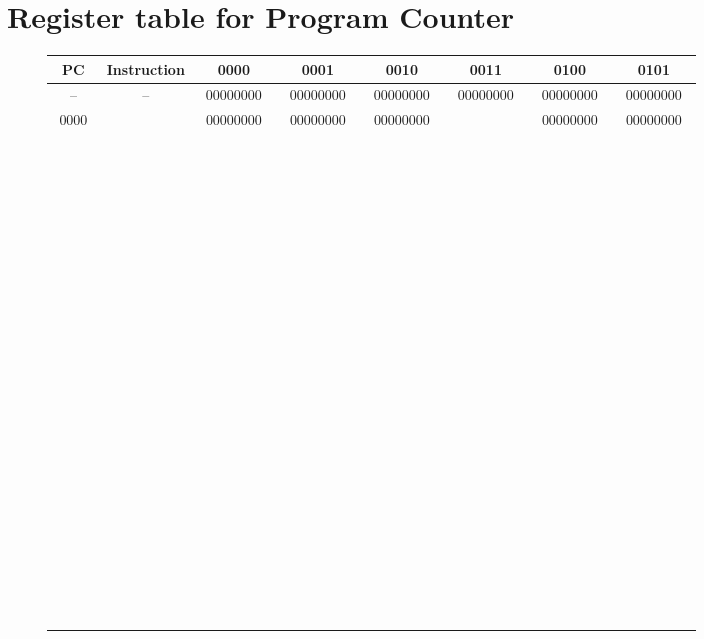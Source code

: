 \documentclass[11pt]{article}
\newcommand{\regname}{\textbf}
\begin{document}
\newpage

\section*{Register table for Program Counter}

\begin{figure}[h]
  \centering
  \begin{tabular}{|c|c||c|c|c|c|c|c|}
    \hline
    \regname{~PC~} &
    \regname{Instruction} &
    \regname{0000} & \regname{0001} & \regname{0010} &
    \regname{0011} & \regname{0100} & \regname{0101} \\
    \hline
    -- & -- & ~00000000~ & ~00000000~ & ~00000000~ & ~00000000~ & ~00000000~ & ~00000000~
    \\ \hline
    0000 & ~ & 00000000 & 00000000 & 00000000 & ~ & 00000000 & 00000000 \\ \hline
    ~ & ~ & ~ & ~ & ~ & ~ & ~ & ~ \\ \hline
    ~ & ~ & ~ & ~ & ~ & ~ & ~ & ~ \\ \hline
    ~ & ~ & ~ & ~ & ~ & ~ & ~ & ~ \\ \hline
    ~ & ~ & ~ & ~ & ~ & ~ & ~ & ~ \\ \hline
    ~ & ~ & ~ & ~ & ~ & ~ & ~ & ~ \\ \hline
    ~ & ~ & ~ & ~ & ~ & ~ & ~ & ~ \\ \hline
    ~ & ~ & ~ & ~ & ~ & ~ & ~ & ~ \\ \hline
    ~ & ~ & ~ & ~ & ~ & ~ & ~ & ~ \\ \hline
    ~ & ~ & ~ & ~ & ~ & ~ & ~ & ~ \\ \hline
    ~ & ~ & ~ & ~ & ~ & ~ & ~ & ~ \\ \hline
    ~ & ~ & ~ & ~ & ~ & ~ & ~ & ~ \\ \hline
    ~ & ~ & ~ & ~ & ~ & ~ & ~ & ~ \\ \hline
    ~ & ~ & ~ & ~ & ~ & ~ & ~ & ~ \\ \hline
    ~ & ~ & ~ & ~ & ~ & ~ & ~ & ~ \\ \hline
    ~ & ~ & ~ & ~ & ~ & ~ & ~ & ~ \\ \hline
    ~ & ~ & ~ & ~ & ~ & ~ & ~ & ~ \\ \hline
    ~ & ~ & ~ & ~ & ~ & ~ & ~ & ~ \\ \hline
    ~ & ~ & ~ & ~ & ~ & ~ & ~ & ~ \\ \hline
    ~ & ~ & ~ & ~ & ~ & ~ & ~ & ~ \\ \hline
    ~ & ~ & ~ & ~ & ~ & ~ & ~ & ~ \\ \hline

\end{tabular}
\end{figure}
\end{document}
